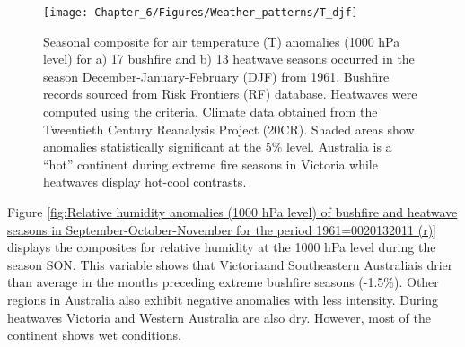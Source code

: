 \begin{figure}[h]
\noindent \begin{centering}
\texttt{[image: Chapter\_6/Figures/Weather\_patterns/T\_djf]}
\par\end{centering}

\caption[Seasonal composite for air temperature (T) anomalies (1000 hPa level)
for a) 17 bushfire and b) 13 heatwave seasons occurred in the season
December-January-February (DJF) from 1961]{Seasonal composite for air temperature (T) anomalies (1000 hPa level)
for a) 17 bushfire and b) 13 heatwave seasons occurred in the season
December-January-February (DJF) from 1961. Bushfire
records sourced from Risk Frontiers (RF) database. Heatwaves were
computed using the \citet{Pezza2012} criteria. Climate data obtained
from the Tweentieth Century Reanalysis Project (20CR). Shaded areas
show anomalies statistically significant at the 5\% level. Australia
is a ``hot'' continent during extreme fire seasons in Victoria while
heatwaves display hot-cool contrasts.\label{fig:Temperature anomalies (1000 hPa level) of bushfire and heatwave seasons in December-January-February for the period 1961=0020132011 (r)}}
\end{figure}


Figure \ref{fig:Relative humidity anomalies (1000 hPa level) of bushfire and heatwave seasons in September-October-November for the period 1961=0020132011 (r)}
displays the composites for relative humidity at the 1000 hPa level
during the season SON. This variable shows that Victoria\textemdash and
Southeastern Australia\textemdash is drier than average in the months
preceding extreme bushfire seasons (-1.5\%). Other regions in Australia
also exhibit negative anomalies with less intensity. During heatwaves
Victoria and Western Australia are also dry. However, most of the
continent shows wet conditions. 

